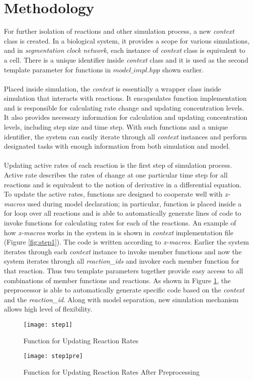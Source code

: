 \documentclass[../thesis.tex]{subfiles}
\begin{document}
\section{Methodology}
For further isolation of reactions and other simulation process, a new \textit{context} class is created. In a biological system, it provides a scope for various simulations, and in \textit{segmentation clock network}, each instance of \textit{context} class is equivalent to a cell. There is a unique identifier inside \textit{context} class and it is used as the second template parameter for functions in $model\_impl.hpp$ shown earlier. \\
\\
Placed inside simulation, the \textit{context} is essentially a wrapper class inside simulation that interacts with reactions. It encapsulates function implementation and is responsible for calculating rate change and updating concentration levels. It also provides necessary information for calculation and updating concentration levels, including step size and time step. With such functions and a unique identifier, the system can easily iterate through all \textit{context} instances and perform designated tasks with enough information from both simulation and model. \\
\\
 Updating active rates of each reaction is the first step of simulation process. Active rate describes the rates of change at one particular time step for all reactions and is equivalent to the notion of derivative in a differential equation. To update the active rates, functions are designed to cooperate well with \textit{x-macros} used during model declaration; in particular, function is placed inside a for loop over all reactions and is able to automatically generate lines of code to invoke functions for calculating rates for each of the reactions. An example of how \textit{x-macros} works in the system in is shown in \textit{context} implementation file (Figure \ref{fig:step1}). The code is written according to \textit{x-macros}. Earlier the system iterates through each \textit{context} instance to invoke member functions and now the system iterates through all \textit{reaction\_ids} and invoker each member function for that reaction. Thus two template parameters together provide easy access to all combinations of member functions and reactions. As shown in Figure \ref{fig:step1pre}, the preprocessor is able to automatically generate specific code based on the \textit{context} and the \textit{reaction\_id}. Along with model separation, new simulation mechanism allows high level of flexibility. 
 \begin{figure}[h]
\centering
\texttt{[image: step1]}
\caption{Function for Updating Reaction Rates}
\label{fig:step1}
\texttt{[image: step1pre]}
\caption{Function for Updating Reaction Rates After Preprocessing}
\label{fig:step1pre}
\end{figure}
\end{document}

